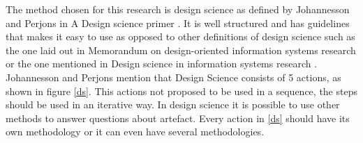 The method chosen for this research is design science as defined by Johannesson and Perjons in A Design science primer \cite{johannesson2012design}. It is well structured and has guidelines that makes it easy to use as opposed to other definitions of design science such as the one laid out in Memorandum on design-oriented information systems research \cite{osterle2010memorandum} or the one mentioned in Design science in information systems research \cite{hevner2004design}. Johannesson and Perjons mention that Design Science consists of 5 actions, as shown in figure \ref{ds}. This actions not proposed to be used in a sequence, the steps should be used in an iterative way. In design science it is possible to use other methods to answer questions about artefact. Every action in \ref{ds} should have its own methodology or it can even have several methodologies.








